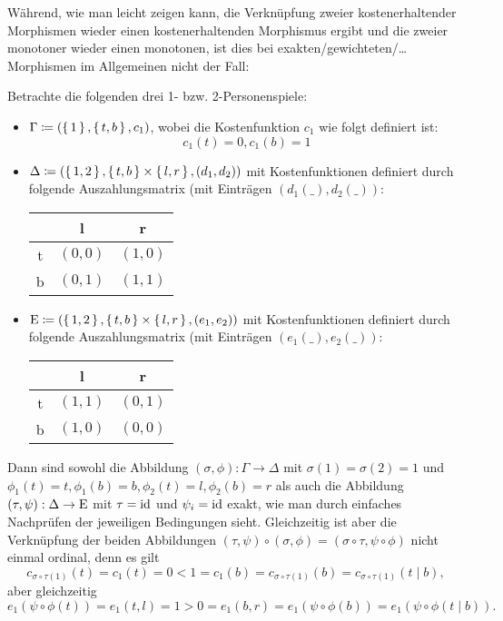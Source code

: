 Während, wie man leicht zeigen kann, die Verknüpfung zweier kostenerhaltender Morphismen wieder einen kostenerhaltenden Morphismus ergibt und die zweier monotoner wieder einen monotonen, ist dies bei exakten/gewichteten/\dots{} Morphismen im Allgemeinen nicht der Fall: 

\begin{bsp}\label{bsp:GegenbspKompositionVMorphismen}
	Betrachte die folgenden drei 1- bzw. 2-Personenspiele:
	\begin{itemize}
		\item $\Gamma \coloneqq (\set{1}, \set{t, b}, c_1)$, wobei die Kostenfunktion $c_1$ wie folgt definiert ist: 
			\[c_1(t) = 0, c_1(b) = 1\]
		\item $\Delta \coloneqq (\set{1, 2}, \set{t, b} \times \set{l, r}, (d_1, d_2))$ mit Kostenfunktionen definiert durch folgende Auszahlungsmatrix (mit Einträgen $(d_1(\_), d_2(\_))$:
		\begin{center}
				\begin{tabular}{c||c|c}
					& l 		& r 		\\\hline\hline
				t	& $(0,0)$	& $(1,0)$	\\\hline
				b	& $(0,1)$	& $(1,1)$ 
			\end{tabular}
		\end{center}
		\item $\mathrm{E} \coloneqq (\set{1, 2}, \set{t, b} \times \set{l, r}, (e_1, e_2))$ mit Kostenfunktionen definiert durch folgende Auszahlungsmatrix (mit Einträgen $(e_1(\_), e_2(\_))$:
		\begin{center}
			\begin{tabular}{c||c|c}
				& l 		& r 		\\\hline\hline
			t	& $(1,1)$	& $(0,1)$	\\\hline
			b	& $(1,0)$	& $(0,0)$ 
			\end{tabular}
		\end{center}
	\end{itemize}
	Dann sind sowohl die Abbildung $(\sigma, \phi): \Gamma \to \Delta$ mit $\sigma(1) = \sigma(2) = 1$ und $\phi_1(t) = t, \phi_1(b) = b, \phi_2(t) = l, \phi_2(b) = r$ als auch die Abbildung $(\tau, \psi): \Delta \to \mathrm{E}$ mit $\tau = \mathrm{id}$ und $\psi_i = \mathrm{id}$ exakt, wie man durch einfaches Nachprüfen der jeweiligen Bedingungen sieht. Gleichzeitig ist aber die Verknüpfung der beiden Abbildungen $(\tau, \psi)\circ(\sigma, \phi) = (\sigma\circ\tau, \psi\circ\phi)$ nicht einmal ordinal, denn es gilt
		\[c_{\sigma\circ\tau(1)}(t) = c_1(t) = 0 < 1 = c_1(b) = c_{\sigma\circ\tau(1)}(b) = c_{\sigma\circ\tau(1)}(t \mid b),\]
	aber gleichzeitig
		\[e_1(\psi\circ\phi(t)) = e_1(t,l) = 1 > 0 = e_1(b,r) = e_1(\psi\circ\phi(b)) = e_1(\psi\circ\phi(t \mid b)).\]
\end{bsp}

